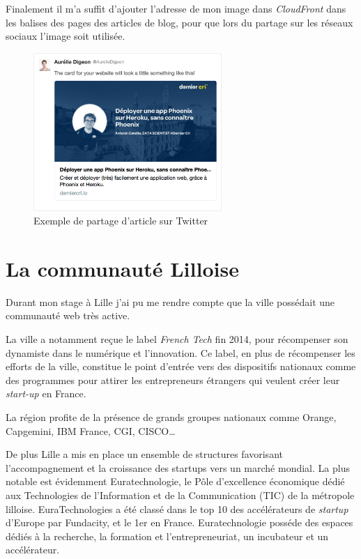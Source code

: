 \documentclass[12pt,a4paper]{article}
\begin{document}
  \bigskip

  Finalement il m'a suffit d'ajouter l'adresse de mon image dans
  \emph{CloudFront} dans les balises des pages des articles de blog, pour
  que lors du partage sur les réseaux sociaux l'image soit utilisée.

  \begin{figure}[h]
    \centering
    \includegraphics[height=6cm]{figures/partage-blog.png}
    \caption{Exemple de partage d'article sur Twitter}
  \end{figure}

  \newpage

  \section{La communauté Lilloise}\label{la-communautuxe9-lilloise}

  Durant mon stage à Lille j'ai pu me rendre compte que la ville possédait
  une communauté web très active.

  \bigskip

  La ville a notamment reçue le label \emph{French Tech} fin 2014, pour
  récompenser son dynamiste dans le numérique et l'innovation. Ce label,
  en plus de récompenser les efforts de la ville, constitue le point
  d'entrée vers des dispositifs nationaux comme des programmes pour
  attirer les entrepreneurs étrangers qui veulent créer leur
  \emph{start-up} en France.

  \bigskip

  La région profite de la présence de grands groupes nationaux comme
  Orange, Capgemini, IBM France, CGI, CISCO\ldots{}

  \bigskip

  De plus Lille a mis en place un ensemble de structures favorisant
  l'accompagnement et la croissance des startups vers un marché mondial.
  La plus notable est évidemment Euratechnologie, le Pôle d'excellence
  économique dédié aux Technologies de l'Information et de la
  Communication (TIC) de la métropole lilloise. EuraTechnologies a été
  classé dans le top 10 des accélérateurs de \emph{startup} d'Europe par
  Fundacity, et le 1er en France. Euratechnologie posséde des espaces
  dédiés à la recherche, la formation et l'entrepreneuriat, un incubateur
  et un accélérateur.
\end{document}
